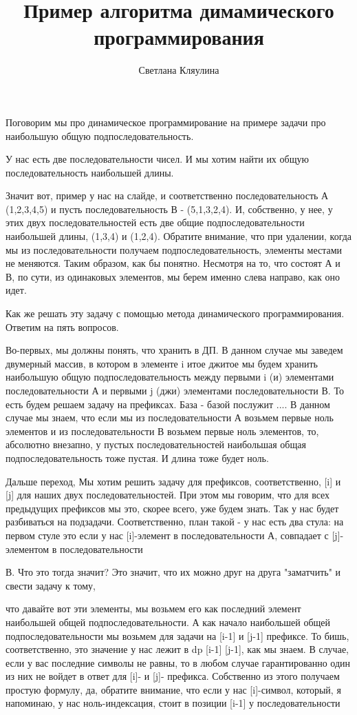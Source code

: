 \documentclass{article}
\title{Пример алгоритма димамического программирования}
\author{Светлана Кляулина}
\date{}
\begin{document}
\maketitle
Поговорим мы про 
динамическое программирование на примере 
задачи про наибольшую общую 
подпоследовательность. 

У нас есть две последовательности чисел. И мы 
хотим найти их общую последовательность наибольшей длины.

Значит вот, пример у нас на слайде, и соответственно последовательность  А (1,2,3,4,5) и пусть последовательность 
В - (5,1,3,2,4). И,  собственно, у нее, у этих двух последовательностей есть две общие подпоследовательности  наибольшей длины, (1,3,4) и (1,2,4).
Обратите внимание, что при удалении, когда мы из последовательности  
получаем подпоследовательность, элементы местами не меняются. Таким образом,  как бы понятно. Несмотря на то, что состоят А и В, по сути, из одинаковых элементов,  мы берем именно слева направо, как оно идет. 

Как же решать эту задачу с помощью метода  
динамического программирования. Ответим на пять вопросов.

Во-первых, мы должны понять, что хранить в ДП. 
В данном случае мы заведем двумерный массив, в котором в элементе  i итое джитое мы будем хранить наибольшую общую подпоследовательность между первыми i (и) элементами последовательности А и  первыми j (джи) элементами последовательности В. То есть будем решаем задачу на префиксах. 
База - базой послужит ....
В данном случае мы знаем, что если мы из последовательности А возьмем   первые ноль элементов и из последовательности В возьмем первые ноль элементов, то, абсолютно  внезапно, у пустых последовательностей 
наибольшая общая подпоследовательность  тоже пустая. И длина тоже будет ноль. 

Дальше переход, 
Мы хотим решить задачу для префиксов, соответственно, [i] и [j] для наших двух последовательностей. При этом мы говорим, что для всех предыдущих префиксов мы это, скорее всего, уже будем знать. Так у нас  
будет разбиваться на подзадачи. Соответственно, 
план такой - у нас есть два стула: на первом стуле  
это если у нас [i]-элемент в последовательности 
А, совпадает с [j]-элементом в последовательности  

В. Что это тогда значит? Это значит, что их можно 
друг на друга "заматчить" и свести задачу к тому,  

что давайте вот эти элементы, мы возьмем 
его как последний элемент наибольшей  
общей подпоследовательности. 
А как начало наибольшей общей  
подпоследовательности мы возьмем для задачи на 
[i-1] и [j-1] префиксе. То бишь, соответственно,  
это значение у нас лежит в dp [i-1] [j-1], как мы 
знаем. В случае, если у вас последние символы не  
равны, то в любом случае гарантированно один из 
них не войдет в ответ для [i]- и [j]- префикса.  
Собственно из этого получаем простую формулу, 
да, обратите внимание, что если у нас [i]-символ,  
который, я напоминаю, у нас ноль-индексация, 
стоит в позиции [i-1] у последовательности  
\end{document}
